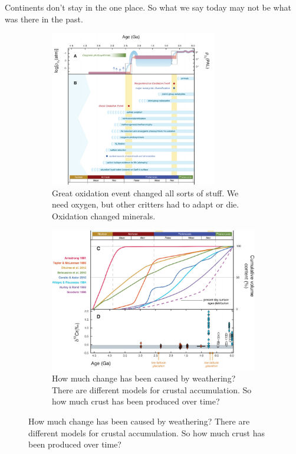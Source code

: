 \documentclass[]{article}
\begin{document}
Continents don't stay in the one place. So what we say today may not be what was there in the past.
\begin{figure}[H]
	\caption{Geologic Record is inseparable from history of life}\label{fig:GeologicRecord} 
	
	\begin{subfigure}[b]{0.45\textwidth}
		\centering
		\caption{Great oxidation event changed all sorts of stuff. We need oxygen, but other critters had to adapt or die. Oxidation changed minerals.}
		\includegraphics[width=0.8\textwidth]{GeologicRecord}
	\end{subfigure}
	\begin{subfigure}[b]{0.45\textwidth}
		\centering
		\caption{How much change has been caused by weathering? There are different models for crustal accumulation. So how much crust has been produced over time?}
		\includegraphics[width=\textwidth]{GeologicRecord1}
	\end{subfigure}
\end{figure}
\end{document}

